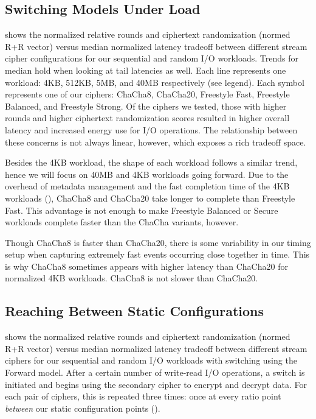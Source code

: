 \subsection{Switching Models Under Load}\label{subsec:eval-baseline}



 shows the normalized relative rounds and ciphertext
randomization (normed R+R vector) versus median normalized latency tradeoff
between different stream cipher configurations for our sequential and random I/O
workloads. Trends for median hold when looking at tail latencies as well. Each
line represents one workload: 4KB, 512KB, 5MB, and 40MB respectively (see
legend). Each symbol represents one of our ciphers: ChaCha8, ChaCha20, Freestyle
Fast, Freestyle Balanced, and Freestyle Strong. Of the ciphers we tested, those
with higher rounds and higher ciphertext randomization scores resulted in higher
overall latency and increased energy use for I/O operations. The relationship
between these concerns is not always linear, however, which exposes a rich
tradeoff space.

Besides the 4KB workload, the shape of each workload follows a similar trend,
hence we will focus on 40MB and 4KB workloads going forward. Due to the overhead
of metadata management and the fast completion time of the 4KB workloads
(), ChaCha8 and ChaCha20 take
longer to complete than Freestyle Fast. This advantage is not enough to make
Freestyle Balanced or Secure workloads complete faster than the ChaCha variants,
however.

Though ChaCha8 is faster than ChaCha20, there is some variability in our timing
setup when capturing extremely fast events occurring close together in time.
This is why ChaCha8 sometimes appears with higher latency than ChaCha20 for
normalized 4KB workloads. ChaCha8 is not slower than ChaCha20.


\subsection{Reaching Between Static Configurations}\label{subsec:eval-dynamic}



 shows the normalized relative rounds and ciphertext
randomization (normed R+R vector) versus median normalized latency tradeoff
between different stream ciphers for our sequential and random I/O workloads
with switching using the Forward model. After a certain number of write-read I/O
operations, a switch is initiated and \sys begins using the secondary cipher to
encrypt and decrypt data. For each pair of ciphers, this is repeated three
times: once at every ratio point {\em between} our static configuration points
().

